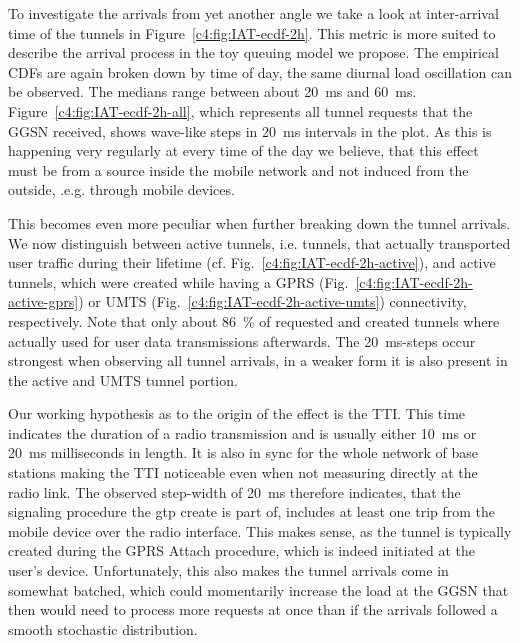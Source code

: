 To investigate the arrivals from yet another angle we take a look at inter-arrival time of the tunnels in Figure~\ref{c4:fig:IAT-ecdf-2h}. This metric is more suited to describe the arrival process in the toy queuing model we propose. The empirical \glspl{CDF} are again broken down by time of day, the same diurnal load oscillation can be observed. The medians range between about \SI{20}{\milli\second} and \SI{60}{\milli\second}. Figure~\ref{c4:fig:IAT-ecdf-2h-all}, which represents all tunnel requests that the \gls{GGSN} received, shows wave-like steps in \SI{20}{\milli\second} intervals in the plot. As this is happening very regularly at every time of the day we believe, that this effect must be from a source inside the mobile network and not induced from the outside, .e.g. through mobile devices.

This becomes even more peculiar when further breaking down the tunnel arrivals. We now distinguish between active tunnels, i.e. tunnels, that actually transported user traffic during their lifetime (cf. Fig.~\ref{c4:fig:IAT-ecdf-2h-active}), and active tunnels, which were created while having a \gls{GPRS} (Fig.~\ref{c4:fig:IAT-ecdf-2h-active-gprs}) or UMTS (Fig.~\ref{c4:fig:IAT-ecdf-2h-active-umts}) connectivity, respectively. Note that only about \SI{86}{\percent} of requested and created tunnels where actually used for user data transmissions afterwards. The \SI{20}{\milli\second}-steps occur strongest when observing all tunnel arrivals, in a weaker form it is also present in the active and \gls{UMTS} tunnel portion. 

Our working hypothesis as to the origin of the effect is the \gls{TTI}. This time indicates the duration of a radio transmission and is usually either \SI{10}{\milli\second} or \SI{20}{\milli\second} milliseconds in length. It is also in sync for the whole network of base stations making the \gls{TTI} noticeable even when not measuring directly at the radio link. The observed step-width of \SI{20}{\milli\second} therefore indicates, that the signaling procedure the \gls{gtp} create is part of, includes at least one trip from the mobile device over the radio interface. This makes sense, as the tunnel is typically created during the \gls{GPRS} Attach procedure, which is indeed initiated at the user's device. Unfortunately, this also makes the tunnel arrivals come in somewhat batched, which could momentarily increase the load at the \gls{GGSN} that then would need to process more requests at once than if the arrivals followed a smooth stochastic distribution.




